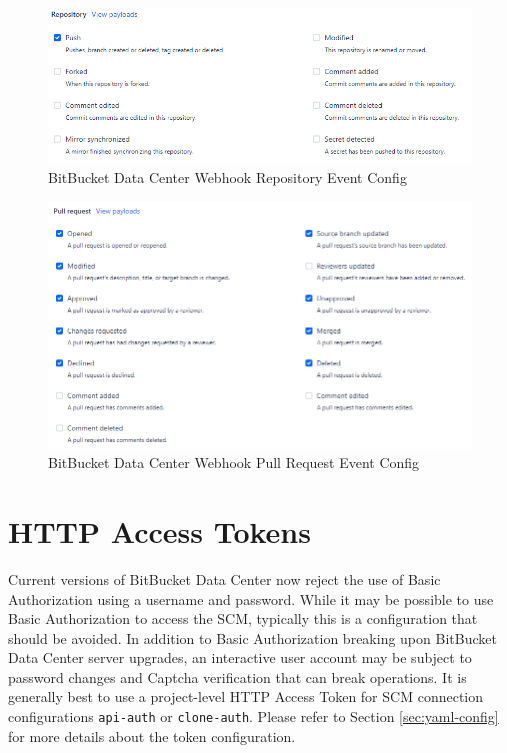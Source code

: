 \begin{figure}[ht]
    \includegraphics[width=\textwidth]{graphics/bbdc-repository-event-config.png}
    \caption{BitBucket Data Center Webhook Repository Event Config}
    \label{fig:bbdc-repo-event-config}
\end{figure}

\begin{figure}[ht]
    \includegraphics[width=\textwidth]{graphics/bbdc-pr-event-config.png}
    \caption{BitBucket Data Center Webhook Pull Request Event Config}
    \label{fig:bbdc-pr-event-config}
\end{figure}


\section{\cxoneflow HTTP Access Tokens}

Current versions of BitBucket Data Center now reject the use of Basic Authorization using
a username and password. While it may be possible to use Basic Authorization to access the SCM, typically
this is a configuration that should be avoided.  In addition to Basic Authorization breaking upon BitBucket Data Center
server upgrades, an interactive user account may be subject to password changes and Captcha verification that
can break \cxoneflow operations.  It is generally best to use a project-level HTTP Access Token for SCM connection
configurations \texttt{api-auth} or \texttt{clone-auth}.  Please refer to Section \ref{sec:yaml-config} for more
details about the token configuration.

